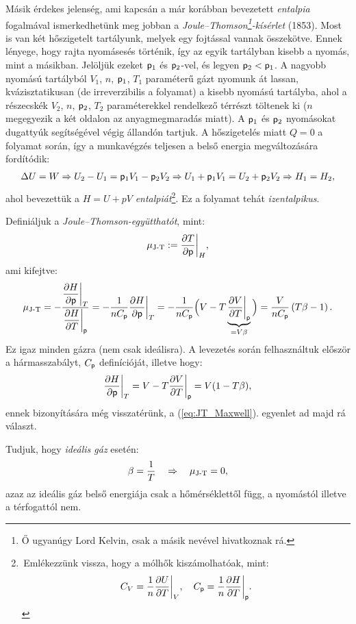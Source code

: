 Másik érdekes jelenség, ami kapcsán a már korábban bevezetett \emph{entalpia} fogalmával ismerkedhetünk meg jobban a \emph{Joule--Thomson\footnote{Ő ugyanúgy Lord Kelvin, csak a másik nevével hivatkoznak rá.}-kísérlet} (1853). Most is van két hőszigetelt tartályunk, melyek egy fojtással vannak összekötve. Ennek lényege, hogy rajta nyomásesés történik, így az egyik tartályban kisebb a nyomás, mint a másikban. Jelöljük ezeket $\mathsf p_1$ és $\mathsf p_2$-vel, és legyen $\mathsf p_2<\mathsf p_1$. A nagyobb nyomású tartályból $V_1$, $n$, $\mathsf p_1$, $T_1$ paraméterű gázt nyomunk át lassan, kvázisztatikusan (de irreverzibilis a folyamat) a kisebb nyomású tartályba, ahol a részecskék $V_2$, $n$, $\mathsf p_2$, $T_2$ paraméterekkel rendelkező térrészt töltenek ki ($n$ megegyezik a két oldalon az anyagmegmaradás miatt). A $\mathsf p_1$ és $\mathsf p_2$ nyomásokat dugattyúk segítségével végig állandón tartjuk. A hőszigetelés miatt $Q=0$ a folyamat során, így a munkavégzés teljesen a belső energia megváltozására fordítódik:
\begin{align}
    \Delta U = W\Rightarrow U_2-U_1 = \mathsf p_1 V_1-\mathsf p_2 V_2 \Rightarrow U_1+\mathsf p_1 V_1 = U_2+\mathsf p_2 V_2 \Rightarrow H_1=H_2,
\end{align}
ahol bevezettük a $H=U+pV$ \emph{entalpiát}\footnote{\,Emlékezzünk vissza, hogy a mólhők kiszámolhatóak, mint:
$$C_V = \frac{1}{n}\frac{\partial{U}}{\partial{T}}\bigg|_V,\quad C_\mathsf p = \frac{1}{n}\frac{\partial{H}}{\partial{T}}\bigg|_\mathsf p.$$}. Ez a folyamat tehát \emph{izentalpikus}.

Definiáljuk a \emph{Joule--Thomson-együtthatót}, mint:
\begin{align}\label{eq:JT_coeff}
    \mu_{\textnormal{J-T}}:=\frac{\partial{T}}{\partial{\mathsf p}}\bigg|_H,
\end{align}
ami kifejtve:
\begin{align}
     \mu_{\textnormal{J-T}} = -\frac{\dfrac{\partial H}{\partial\mathsf p}\bigg|_T}{\dfrac{\partial H}{\partial T}\bigg|_\mathsf p}=-\frac{1}{nC_\mathsf p}\frac{\partial{H}}{\partial{\mathsf p}}\bigg|_T = -\frac{1}{nC_\mathsf p}\Big(V-T\underbrace{\frac{\partial{V}}{\partial{T}}\bigg|_\mathsf p}_{=V\beta}\Big)=\frac{V}{nC_\mathsf p}\left({T\beta-1}\right).
\end{align}
Ez igaz minden gázra (nem csak ideálisra). A levezetés során felhasználtuk először a hármasszabályt, $C_\mathsf p$ definícióját, illetve hogy:
\begin{align}
    \frac{\partial{H}}{\partial{\mathsf p}}\bigg|_T = V-T\frac{\partial{V}}{\partial{T}}\bigg|_\mathsf p=V(1-T\beta),
\end{align}
ennek bizonyítására még visszatérünk, a (\ref{eq:JT_Maxwell}). egyenlet ad majd rá választ. 

Tudjuk, hogy \emph{ideális gáz} esetén:
\begin{align}
    \beta = \frac{1}{T} \quad\Rightarrow\quad \mu_{\textnormal{J-T}} = 0,
\end{align}
azaz az ideális gáz belső energiája csak a hőmérséklettől függ, a nyomástól illetve a térfogattól nem.


